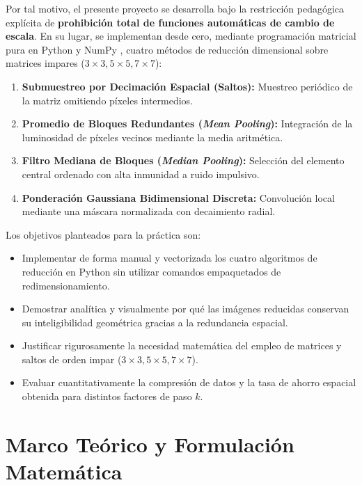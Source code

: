\documentclass{article}
\begin{document}
Por tal motivo, el presente proyecto se desarrolla bajo la restricción pedagógica explícita de \textbf{prohibición total de funciones automáticas de cambio de escala}. En su lugar, se implementan desde cero, mediante programación matricial pura en Python y NumPy \cite{harris2020array}, cuatro métodos de reducción dimensional sobre matrices impares ($3\times3, 5\times5, 7\times7$):
\begin{enumerate}
    \item \textbf{Submuestreo por Decimación Espacial (Saltos):} Muestreo periódico de la matriz omitiendo píxeles intermedios.
    \item \textbf{Promedio de Bloques Redundantes (\textit{Mean Pooling}):} Integración de la luminosidad de píxeles vecinos mediante la media aritmética.
    \item \textbf{Filtro Mediana de Bloques (\textit{Median Pooling}):} Selección del elemento central ordenado con alta inmunidad a ruido impulsivo.
    \item \textbf{Ponderación Gaussiana Bidimensional Discreta:} Convolución local mediante una máscara normalizada con decaimiento radial.
\end{enumerate}

Los objetivos planteados para la práctica son:
\begin{itemize}
    \item Implementar de forma manual y vectorizada los cuatro algoritmos de reducción en Python sin utilizar comandos empaquetados de redimensionamiento.
    \item Demostrar analítica y visualmente por qué las imágenes reducidas conservan su inteligibilidad geométrica gracias a la redundancia espacial.
    \item Justificar rigurosamente la necesidad matemática del empleo de matrices y saltos de orden impar ($3\times3, 5\times5, 7\times7$).
    \item Evaluar cuantitativamente la compresión de datos y la tasa de ahorro espacial obtenida para distintos factores de paso $k$.
\end{itemize}


\section{Marco Teórico y Formulación Matemática}
\end{document}
